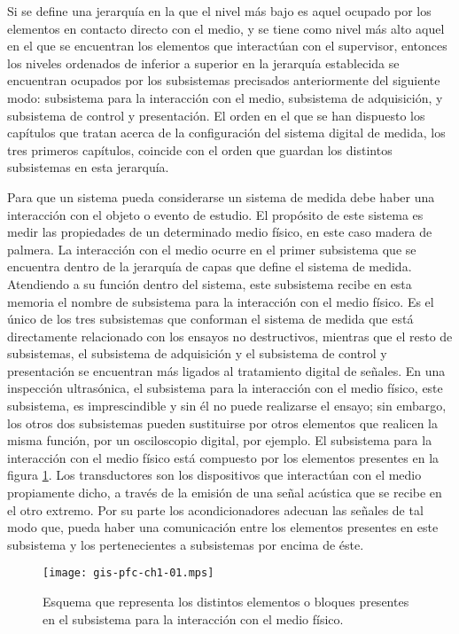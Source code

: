 Si se define una jerarquía en la que el nivel más bajo es aquel ocupado por
los elementos en contacto directo con el medio, y se tiene como nivel más
alto aquel en el que se encuentran los elementos que interactúan con el
supervisor, entonces los niveles ordenados de inferior a superior en la
jerarquía establecida se encuentran ocupados por los subsistemas precisados
anteriormente del siguiente modo: subsistema para la interacción con el
medio, subsistema de adquisición, y subsistema de control y presentación.
El orden en el que se han dispuesto los capítulos que tratan acerca de la
configuración del sistema digital de medida, los tres primeros capítulos,
coincide con el orden que guardan los distintos subsistemas en esta
jerarquía.



Para que un sistema pueda considerarse un sistema de medida debe haber una
interacción con el objeto o evento de estudio. El propósito de este sistema
es medir las propiedades de un determinado medio físico, en este caso
madera de palmera. La interacción con el medio ocurre en el primer
subsistema que se encuentra dentro de la jerarquía de capas que define el
sistema de medida. Atendiendo a su función dentro del sistema, este
subsistema recibe en esta memoria el nombre de subsistema para la
interacción con el medio físico. Es el único de los tres subsistemas que
conforman el sistema de medida que está directamente relacionado con los
ensayos no destructivos, mientras que el resto de subsistemas, el
subsistema de adquisición y el subsistema de control y presentación se
encuentran más ligados al tratamiento digital de señales. En una inspección
ultrasónica, el subsistema para la interacción con el medio físico, este
subsistema, es imprescindible y sin él no puede realizarse el ensayo; sin
embargo, los otros dos subsistemas pueden sustituirse por otros elementos
que realicen la misma función, por un osciloscopio digital, por ejemplo. El
subsistema para la interacción con el medio físico está compuesto por los
elementos presentes en la figura \cref{fig:submedium}. Los transductores
son los dispositivos que interactúan con el medio propiamente dicho, a
través de la emisión de una señal acústica que se recibe en el otro
extremo. Por su parte los acondicionadores adecuan las señales de tal modo
que, pueda haber una comunicación entre los elementos presentes en este
subsistema y los pertenecientes a subsistemas por encima de éste.

\begin{figure}
	\begin{center}
		\texttt{[image: gis-pfc-ch1-01.mps]}
	\end{center}
	\caption[Subsistema para la interacción del medio físico]{Esquema
	que representa los distintos elementos o bloques presentes en el
	subsistema para la interacción con el medio físico.}
	\label{fig:submedium}
\end{figure}

